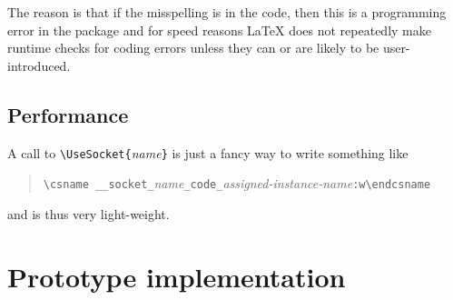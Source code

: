 \documentclass{article}
\newcommand\cs[1]{\texttt{\textbackslash #1}}
\newcommand\meta[1]{\textlangle\textit{#1}\textrangle}
\newcommand\marg[1]{\texttt\{\meta{#1}\texttt\}}
\begin{document}
The reason is that if the misspelling is in the code, then this is a
programming error in the package and for speed reasons \LaTeX{} does
not repeatedly make runtime checks for coding errors unless they can or
are likely to be user-introduced.

\subsection{Performance}

A call to \cs{UseSocket}\marg{name} is just a fancy way to write something like
\begin{quote}
  \verb=\csname __socket_=\meta{name}\verb=_code_=\meta{assigned-instance-name}\verb=:w\endcsname=
\end{quote}
and is thus very light-weight.



\section{Prototype implementation}

\begin{verbatim}
\end{verbatim}
\end{document}
